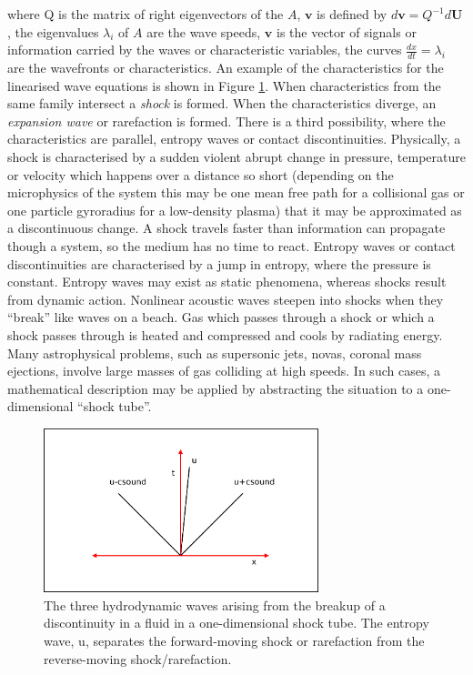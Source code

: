 where Q is the matrix of right eigenvectors of the $A$,
$\mathbf{v}$ is defined by $d\mathbf{v} = Q^{-1} d\mathbf{U}$,
the eigenvalues $\lambda_i$ of $A$ are the wave speeds,
$\mathbf{v}$ is the vector of signals or information carried by the waves or characteristic variables,
the curves $\frac{dx}{dt}=\lambda_i$ are the wavefronts or characteristics.
An example of the characteristics for the linearised wave equations is shown in Figure \ref{fig:HDWaves}.
When characteristics from the same family intersect a \emph{shock} is formed.
When the characteristics diverge, an \emph{expansion wave} or rarefaction is formed.
There is a third possibility, where the characteristics are parallel, entropy waves or contact discontinuities.
Physically, a shock is characterised by a sudden violent abrupt change in pressure, temperature or velocity which happens over a distance so short (depending on the microphysics of the system this may be one mean free path for a collisional gas or one particle gyroradius for a low-density plasma) that it may be approximated as a discontinuous change. 
A shock travels faster than information can propagate though a system, so the medium has no time to react.
Entropy waves or contact discontinuities are characterised by a jump in entropy, where the pressure is constant. Entropy waves may exist as static phenomena, whereas shocks result from dynamic action.
Nonlinear acoustic waves steepen into shocks when they ``break'' like waves on a beach.  
Gas which passes through a shock or which a shock passes through is heated and compressed and cools by radiating energy.
Many astrophysical problems, such as supersonic jets, novas, coronal mass ejections, involve large masses of gas colliding at high speeds. 
In such cases, a mathematical description may be applied by abstracting the situation to a one-dimensional ``shock tube''.


\begin{figure}[t]
\centering
\includegraphics[width=8cm]{HDWaves}
\caption{
The three hydrodynamic waves arising from the breakup of a discontinuity in a fluid in a one-dimensional shock tube. The entropy wave, u, separates the forward-moving shock or rarefaction from the reverse-moving shock/rarefaction.
}
\label{fig:HDWaves} %
\end{figure}

